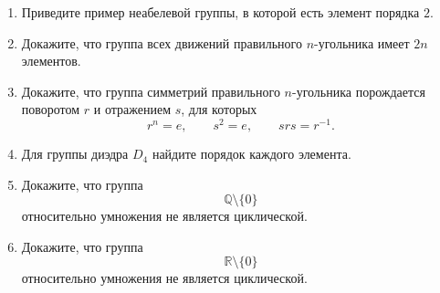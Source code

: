 \begin{enumerate}
    \item Приведите пример неабелевой группы, в которой есть элемент порядка \(2\).

    \item Докажите, что группа всех движений правильного \(n\)-угольника имеет \(2n\) элементов.

    \item Докажите, что группа симметрий правильного \(n\)-угольника порождается поворотом \(r\) и отражением \(s\), для которых
    \[
        r^n=e,\qquad s^2=e,\qquad srs=r^{-1}.
    \]

    \item Для группы диэдра \(D_4\) найдите порядок каждого элемента.

    \item Докажите, что группа
    \[
        \mathbb Q\setminus\{0\}
    \]
    относительно умножения не является циклической.

    \item Докажите, что группа
    \[
        \mathbb R\setminus\{0\}
    \]
    относительно умножения не является циклической.
    
\end{enumerate} 